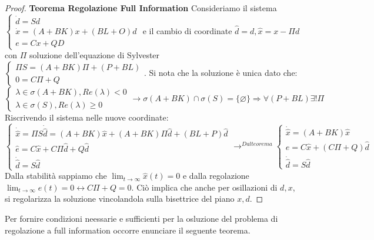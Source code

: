 \documentclass{article}
\theoremstyle{definition}
\begin{document}
\begin{proof}{\textbf{Teorema Regolazione Full Information}}
    Consideriamo il sistema \(\begin{cases}
        \dot{d}=Sd              \\
        \dot{x}=(A+BK)x+(BL+O)d \\
        e=Cx+QD
    \end{cases}\) e il cambio di coordinate \(\hat{d}=d,\hat{x}=x-\Pi d\) con \(\Pi \) soluzione dell'equazione di Sylvester \( \begin{cases}
        \Pi S=(A+BK)\Pi+(P+BL)\\
        0=C\Pi+Q
    \end{cases}\).\newline
    Si nota che la soluzione è unica dato che:\begin{equation*}
        \begin{cases}
            \lambda\in\sigma{(A+BK)},Re(\lambda )< 0 \\
            \lambda\in\sigma{(S)},Re(\lambda )\geq 0
        \end{cases}\rightarrow\sigma{(A+BK)}\cap\sigma{(S)}=\{\varnothing \}\Rightarrow \forall(P+BL)\exists!\Pi
    \end{equation*}
    Riscrivendo il sistema nelle nuove coordinate:
    \begin{equation*}
        \begin{cases}
            \dot{\hat{x}}=\Pi S\dot{\hat{d}}=(A+BK)\hat{x}+(A+BK)\Pi\hat{d}+(BL+P)\hat{d}\\
            \hat{e}=C\hat{x}+C\Pi\hat{d}+Q\hat{d}\\
            \dot{\hat{d}}=S\hat{d}
        \end{cases}
        \rightarrow^{Dal teorema}\begin{cases}
            \dot{\hat{x}}=(A+BK)\hat{x}\\
            e=C\hat{x}+(C\Pi+Q)\hat{d}\\
            \dot{\hat{d}}=S\hat{d}
        \end{cases}
    \end{equation*}
    Dalla stabilità sappiamo che \(\lim_{t\rightarrow\infty} \hat{x}(t)=0\) e dalla regolazione \(\lim_{t\rightarrow\infty}e(t)=0\leftrightarrow C\Pi+Q=0\). Ciò implica che anche per osillazioni di \(d,x\), si regolarizza la soluzione vincolandola sulla bisettrice del piano \(x,d\).
\end{proof}
Per fornire condizioni neessarie e sufficienti per la osluzione del problema di regolazione a full information occorre enunciare il seguente teorema.
\end{document}
